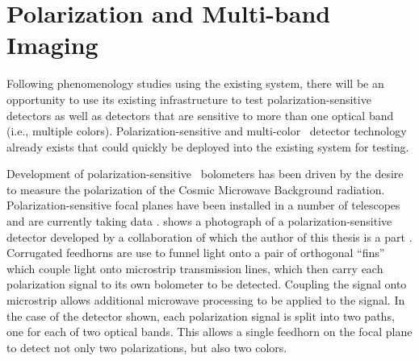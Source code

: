 \section{Polarization and Multi-band Imaging}

Following phenomenology studies using the existing system, there will be an opportunity to use its existing infrastructure to test polarization-sensitive detectors as well as detectors that are sensitive to more than one optical band (i.e., multiple colors).
Polarization-sensitive and multi-color \TES\ detector technology already exists that could quickly be deployed into the existing system for testing.

Development of polarization-sensitive \TES\ bolometers has been driven by the desire to measure the polarization of the Cosmic Microwave Background radiation.
Polarization-sensitive focal planes have been installed in a number of telescopes and are currently taking data \cite{obrient_antenna-coupled_2012,austermann_sptpol:_2012,keating_ultra_2011,niemack_actpol:_2010,kusaka_modulation_2013}.
 shows a photograph of a polarization-sensitive detector developed by a collaboration of which the author of this thesis is a part \cite{datta_horn_2014}.
Corrugated feedhorns are use to funnel light onto a pair of orthogonal ``fins'' which couple light onto microstrip transmission lines, which then carry each polarization signal to its own bolometer to be detected.
Coupling the signal onto microstrip allows additional microwave processing to be applied to the signal.
In the case of the detector shown, each polarization signal is split into two paths, one for each of two optical bands.
This allows a single feedhorn on the focal plane to detect not only two polarizations, but also two colors.

